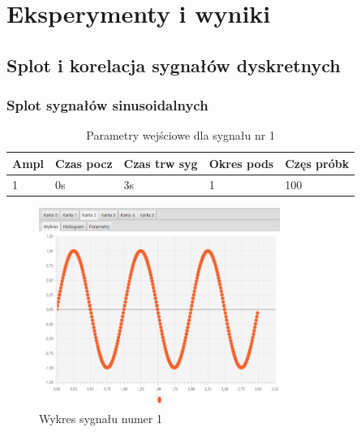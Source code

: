 \documentclass[12pt]{article}
\begin{document}
    \section{Eksperymenty i wyniki} {

        \subsection{Splot i korelacja sygnałów dyskretnych} {

            \subsubsection{Splot sygnałów sinusoidalnych} \label{eksperyment:splot1}{

                \begin{table}[H]
                    \centering
                    \begin{tabular}{|l|l|l|l|l|}
                        \hline
                        Ampl & Czas pocz & Czas trw syg & Okres pods & Częs próbk   \\ \hline
                        1 & 0s & 3s & 1 & 100           \\ \hline
                    \end{tabular}
                    \caption{Parametry wejściowe dla sygnału nr 1}
                \end{table}
                \begin{figure}[H]
                    \centering
                    \includegraphics[width=0.7\textwidth]{img/result/convolution/experiment1/data_105849.png}
                    \caption{Wykres sygnału numer 1}
                \end{figure}

}}}
\end{document}
